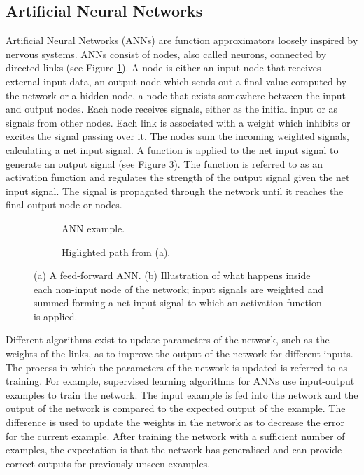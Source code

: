 \newpage
\subsection{Artificial Neural Networks}
Artificial Neural Networks (ANNs) are function approximators loosely inspired by nervous systems.
ANNs consist of nodes, also called neurons, connected by directed links (see Figure \ref{feedforward}). 
A node is either an input node that receives external input data, an output node which sends out a final value computed
by the network or a hidden node, a node that exists somewhere between the input and output nodes. Each node receives signals, either
as the initial input or as signals from other nodes. Each link is associated with a weight which inhibits or excites the signal 
passing over it. The nodes sum the incoming weighted signals, calculating a net input signal. A function is applied to the net input 
signal to generate an output signal (see Figure \ref{neuron}). The function is referred to as an activation function and regulates the strength of the output 
signal given the net input signal. The signal is propagated through the network until it reaches the final output node or nodes.


\begin{figure}[htb]
    \begin{mdframed}
        \begin{subfigure}[b]{0.5\textwidth}
            \centering
            \resizebox{0.7\textwidth}{!}{}
            \caption{ANN example.}
            \label{feedforward}
        \end{subfigure}
        \begin{subfigure}[b]{0.5\textwidth}
            \centering
            \resizebox{0.9\textwidth}{!}{}
            \caption{Higlighted path from (a).}
            \label{neuron}
        \end{subfigure}
    \end{mdframed}
    \caption{(a) A feed-forward ANN. (b) Illustration of what happens inside each non-input node of the network; input
                 signals are weighted and summed forming a net input signal to which an activation function is applied.}
\end{figure}

Different algorithms exist to update parameters of the network, such as the weights of the
links, as to improve the output of the network for different inputs. The process in which the parameters of 
the network is updated is referred to as training. For example, supervised learning algorithms for ANNs use input-output 
examples to train the network. The input example is fed into the network and the output of the network is compared 
to the expected output of the example. The difference is used to update the weights in the network as to decrease
the error for the current example. After training the network with a sufficient number of examples, the expectation is 
that the network has generalised and can provide correct outputs for previously unseen examples.


